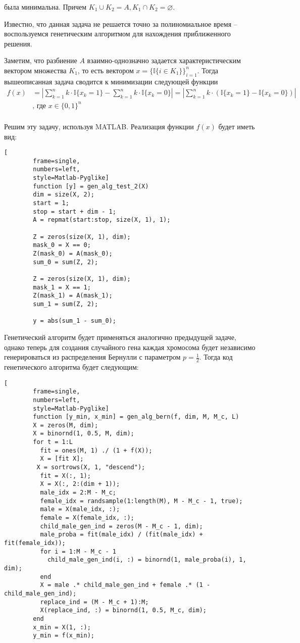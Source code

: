 \documentclass[../main.tex]{subfiles}
\begin{document}
	была минимальна. Причем $K_1 \cup K_2 = A, K_1 \cap K_2 = \varnothing$.
	
	Известно, что данная задача не решается точно за полиномиальное время -- воспользуемся генетическим алгоритмом для нахождения приближенного решения.
	
	Заметим, что разбиение $A$ взаимно-однозначно задается характеристическим вектором множества $K_1$, то есть вектором $x = \{\mathbb{I}\{i \in K_1\}\}_{i=1}^n$. Тогда вышеописанная задача сводится к минимизации  следующей функции 
	\[\begin{aligned}
		f(x) &= \left|\sum_{k=1}^{n}k \cdot \mathbb{I}\{x_k = 1\}  - \sum_{k=1}^{n}k \cdot \mathbb{I}\{x_k = 0\} \right| = \left|\sum_{k=1}^{n}k \cdot (\mathbb{I}\{x_k = 1\}  -\mathbb{I}\{x_k = 0\})\right| \\
		&\text{, где }x \in \{0, 1\}^n \\
	\end{aligned}\]
	
	Решим эту задачу, используя MATLAB. Реализация функции $f(x)$ будет иметь вид:
	
	\begin{lstlisting}[
		frame=single,
		numbers=left,
		style=Matlab-Pyglike]
		function [y] = gen_alg_test_2(X)
		dim = size(X, 2);
		start = 1;
		stop = start + dim - 1;
		A = repmat(start:stop, size(X, 1), 1);
		
		Z = zeros(size(X, 1), dim);
		mask_0 = X == 0;
		Z(mask_0) = A(mask_0);
		sum_0 = sum(Z, 2);
		
		Z = zeros(size(X, 1), dim);
		mask_1 = X == 1;
		Z(mask_1) = A(mask_1);
		sum_1 = sum(Z, 2);
		
		y = abs(sum_1 - sum_0);	
	\end{lstlisting}

	Генетический алгоритм будет применяться аналогично предыдущей задаче, однако теперь для создания случайного гена каждая хромосома будет независимо генерироваться из распределения Бернулли с параметром $p = \frac{1}{2}$. Тогда код генетического алгоритма будет следующим:
	
		\begin{lstlisting}[
		frame=single,
		numbers=left,
		style=Matlab-Pyglike]
		function [y_min, x_min] = gen_alg_bern(f, dim, M, M_c, L) 
		X = zeros(M, dim);
		X = binornd(1, 0.5, M, dim);
		for t = 1:L
		  fit = ones(M, 1) ./ (1 + f(X));
		  X = [fit X];
	 	 X = sortrows(X, 1, "descend");
		  fit = X(:, 1);
		  X = X(:, 2:(dim + 1));
		  male_idx = 2:M - M_c;
		  female_idx = randsample(1:length(M), M - M_c - 1, true);
		  male = X(male_idx, :);
		  female = X(female_idx, :);
		  child_male_gen_ind = zeros(M - M_c - 1, dim);
		  male_proba = fit(male_idx) / (fit(male_idx) + fit(female_idx));
		  for i = 1:M - M_c - 1
		    child_male_gen_ind(i, :) = binornd(1, male_proba(i), 1, dim);
		  end
		  X = male .* child_male_gen_ind + female .* (1 - child_male_gen_ind);
		  replace_ind = (M - M_c + 1):M;
		  X(replace_ind, :) = binornd(1, 0.5, M_c, dim);
		end
		x_min = X(1, :);
		y_min = f(x_min);
	\end{lstlisting}
\end{document}
